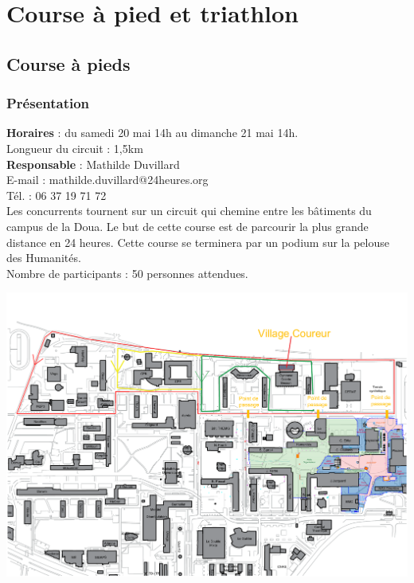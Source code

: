 \documentclass[hidelinks, paper=a4, fontsize=13pt]{report}
\begin{document}
\section{Course à pied et triathlon}
\subsection{Course à pieds}

\subsubsection{Présentation}
\textbf{Horaires} : du samedi 20 mai 14h au dimanche 21 mai 14h.\\

Longueur du circuit : 1,5km\\

\textbf{Responsable} : Mathilde Duvillard\\
	E-mail : mathilde.duvillard@24heures.org\\
	Tél. : 06 37 19 71 72\\

Les concurrents tournent sur un circuit qui chemine entre les bâtiments du campus de la Doua. Le but de cette course est de parcourir la plus grande distance en 24 heures. Cette course se terminera par un podium sur la pelouse des Humanités. \\

Nombre de participants : 50 personnes attendues.\\


\begin{center}
\includegraphics[width=.8\textwidth,keepaspectratio]{Exports/Plan_24h_44eme-Parcours_courses}
\end{center}
\end{document}

